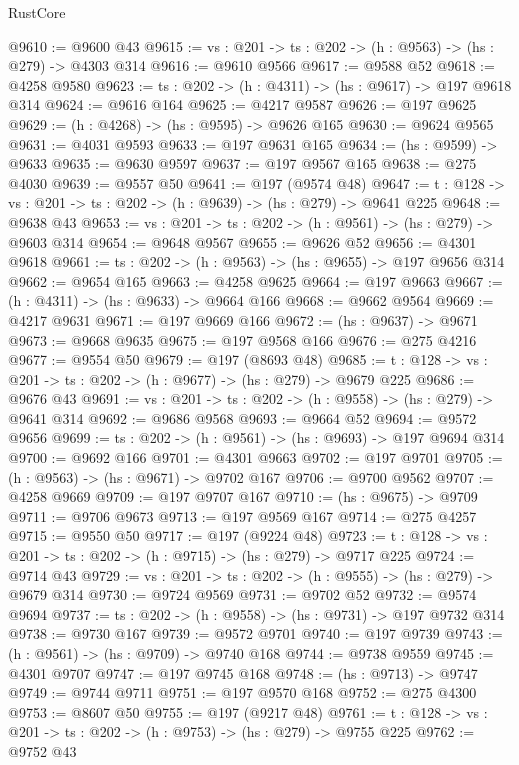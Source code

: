 \begin{lexlean}{RustCore}
\begin{coremodule}
@9610 := @9600 @43
@9615 := {vs : @201} -> {ts : @202} -> (h : @9563) -> (hs : @279) -> @4303 @314
@9616 := @9610 @9566
@9617 := @9588 @52
@9618 := @4258 @9580
@9623 := {ts : @202} -> (h : @4311) -> (hs : @9617) -> @197 @9618 @314
@9624 := @9616 @164
@9625 := @4217 @9587
@9626 := @197 @9625
@9629 := (h : @4268) -> (hs : @9595) -> @9626 @165
@9630 := @9624 @9565
@9631 := @4031 @9593
@9633 := @197 @9631 @165
@9634 := (hs : @9599) -> @9633
@9635 := @9630 @9597
@9637 := @197 @9567 @165
@9638 := @275 @4030
@9639 := @9557 @50
@9641 := @197 (@9574 @48)
@9647 := {t : @128} -> {vs : @201} -> {ts : @202} -> (h : @9639) -> (hs : @279) -> @9641 @225
@9648 := @9638 @43
@9653 := {vs : @201} -> {ts : @202} -> (h : @9561) -> (hs : @279) -> @9603 @314
@9654 := @9648 @9567
@9655 := @9626 @52
@9656 := @4301 @9618
@9661 := {ts : @202} -> (h : @9563) -> (hs : @9655) -> @197 @9656 @314
@9662 := @9654 @165
@9663 := @4258 @9625
@9664 := @197 @9663
@9667 := (h : @4311) -> (hs : @9633) -> @9664 @166
@9668 := @9662 @9564
@9669 := @4217 @9631
@9671 := @197 @9669 @166
@9672 := (hs : @9637) -> @9671
@9673 := @9668 @9635
@9675 := @197 @9568 @166
@9676 := @275 @4216
@9677 := @9554 @50
@9679 := @197 (@8693 @48)
@9685 := {t : @128} -> {vs : @201} -> {ts : @202} -> (h : @9677) -> (hs : @279) -> @9679 @225
@9686 := @9676 @43
@9691 := {vs : @201} -> {ts : @202} -> (h : @9558) -> (hs : @279) -> @9641 @314
@9692 := @9686 @9568
@9693 := @9664 @52
@9694 := @9572 @9656
@9699 := {ts : @202} -> (h : @9561) -> (hs : @9693) -> @197 @9694 @314
@9700 := @9692 @166
@9701 := @4301 @9663
@9702 := @197 @9701
@9705 := (h : @9563) -> (hs : @9671) -> @9702 @167
@9706 := @9700 @9562
@9707 := @4258 @9669
@9709 := @197 @9707 @167
@9710 := (hs : @9675) -> @9709
@9711 := @9706 @9673
@9713 := @197 @9569 @167
@9714 := @275 @4257
@9715 := @9550 @50
@9717 := @197 (@9224 @48)
@9723 := {t : @128} -> {vs : @201} -> {ts : @202} -> (h : @9715) -> (hs : @279) -> @9717 @225
@9724 := @9714 @43
@9729 := {vs : @201} -> {ts : @202} -> (h : @9555) -> (hs : @279) -> @9679 @314
@9730 := @9724 @9569
@9731 := @9702 @52
@9732 := @9574 @9694
@9737 := {ts : @202} -> (h : @9558) -> (hs : @9731) -> @197 @9732 @314
@9738 := @9730 @167
@9739 := @9572 @9701
@9740 := @197 @9739
@9743 := (h : @9561) -> (hs : @9709) -> @9740 @168
@9744 := @9738 @9559
@9745 := @4301 @9707
@9747 := @197 @9745 @168
@9748 := (hs : @9713) -> @9747
@9749 := @9744 @9711
@9751 := @197 @9570 @168
@9752 := @275 @4300
@9753 := @8607 @50
@9755 := @197 (@9217 @48)
@9761 := {t : @128} -> {vs : @201} -> {ts : @202} -> (h : @9753) -> (hs : @279) -> @9755 @225
@9762 := @9752 @43

\end{coremodule}
\end{lexlean}
